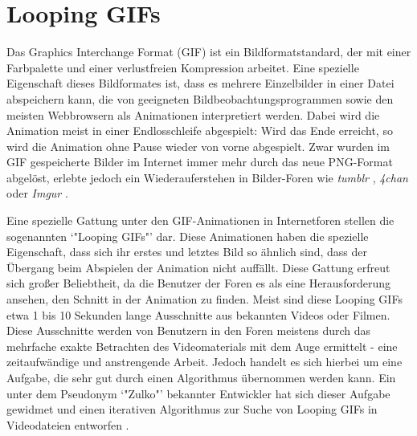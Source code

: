 \chapter{Looping GIFs}
Das Graphics Interchange Format (GIF) ist ein Bildformatstandard, der mit einer Farbpalette und einer verlustfreien Kompression arbeitet. Eine spezielle Eigenschaft dieses Bildformates ist, dass es mehrere Einzelbilder in einer Datei abspeichern kann, die von geeigneten Bildbeobachtungsprogrammen sowie den meisten Webbrowsern als Animationen interpretiert werden. Dabei wird die Animation meist in einer Endlosschleife abgespielt: Wird das Ende erreicht, so wird die Animation ohne Pause wieder von vorne abgespielt. Zwar wurden im GIF gespeicherte Bilder im Internet immer mehr durch das neue PNG-Format abgelöst, erlebte jedoch ein Wiederauferstehen in Bilder-Foren wie \textit{tumblr} \cite{Tumblr:1}, \textit{4chan} \cite{4chan:1} oder \textit{Imgur} \cite{Imgur:1}. 

Eine spezielle Gattung unter den GIF-Animationen in Internetforen stellen die sogenannten `"Looping GIFs"' dar. Diese Animationen haben die spezielle Eigenschaft, dass sich ihr erstes und letztes Bild so ähnlich sind, dass der Übergang beim Abspielen der Animation nicht auffällt. Diese Gattung erfreut sich großer Beliebtheit, da die Benutzer der Foren es als eine Herausforderung ansehen, den Schnitt in der Animation zu finden. Meist sind diese Looping GIFs etwa 1 bis 10 Sekunden lange Ausschnitte aus bekannten Videos oder Filmen. Diese Ausschnitte werden von Benutzern in den Foren meistens durch das mehrfache exakte Betrachten des Videomaterials mit dem Auge ermittelt - eine zeitaufwändige und anstrengende Arbeit. Jedoch handelt es sich hierbei um eine Aufgabe, die sehr gut durch einen Algorithmus übernommen werden kann. Ein unter dem Pseudonym `"Zulko"' \cite{Zulko:1} bekannter Entwickler hat sich dieser Aufgabe gewidmet und einen iterativen Algorithmus \cite{Goldberg:1} zur Suche von Looping GIFs in Videodateien entworfen \cite{Zulko:2}. 